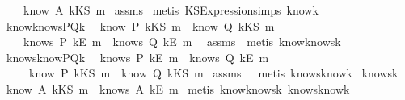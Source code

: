 \begin{isabellebody}
\ \ \ \ {\isachardoublequoteopen}know\ A\ {\isacharparenleft}kKS\ m{\isacharparenright}{\isachardoublequoteclose}\isanewline
\isadelimproof
\endisadelimproof
\isatagproof
{}\isamarkupfalse \ assms\isanewline
{}\isamarkupfalse \ {\isacharparenleft}metis\ KS{}Expression{\isachardot}simps{\isacharparenleft}{}{\isacharparenright}\ know{}k{\isacharparenright}\endisatagproof
{\isafoldproof}\isadelimproof
\isanewline
\endisadelimproof
\isanewline
{}\isamarkupfalse \ know{}knowsPQ{\isacharunderscore}k{\isacharcolon}\ \isanewline
{}\ {\isachardoublequoteopen}know\ P\ {\isacharparenleft}kKS\ m{\isacharparenright}\ {\isasymor}\ know\ Q\ {\isacharparenleft}kKS\ m{\isacharparenright}{\isachardoublequoteclose}\isanewline
{}\ \ \ \ {\isachardoublequoteopen}knows\ P\ {\isacharbrackleft}kE\ m{\isacharbrackright}\ {\isasymor}\ knows\ Q\ {\isacharbrackleft}kE\ m{\isacharbrackright}{\isachardoublequoteclose}\ \isanewline
\isadelimproof
\endisadelimproof
\isatagproof
{}\isamarkupfalse \ assms\ \isamarkupfalse \ {\isacharparenleft}metis\ know{}knows{\isacharunderscore}k{\isacharparenright}\endisatagproof
{\isafoldproof}\isadelimproof
\isanewline
\endisadelimproof
\isanewline
{}\isamarkupfalse \ knows{}knowPQ{\isacharunderscore}k{\isacharcolon}\ \isanewline
{}\ {\isachardoublequoteopen}knows\ P\ {\isacharbrackleft}kE\ m{\isacharbrackright}\ {\isasymor}\ knows\ Q\ {\isacharbrackleft}kE\ m{\isacharbrackright}{\isachardoublequoteclose}\isanewline
{}\ \ \ \ \ {\isachardoublequoteopen}know\ P\ {\isacharparenleft}kKS\ m{\isacharparenright}\ {\isasymor}\ know\ Q\ {\isacharparenleft}kKS\ m{\isacharparenright}{\isachardoublequoteclose}\isanewline
\isadelimproof
\endisadelimproof
\isatagproof
{}\isamarkupfalse \ assms\ \ \isamarkupfalse \ {\isacharparenleft}metis\ knows{}know{\isacharunderscore}k{\isacharparenright}\endisatagproof
{\isafoldproof}\isadelimproof
\isanewline
\endisadelimproof
\isanewline
{}\isamarkupfalse \ knows{}k{\isacharcolon}\ \isanewline
\ {\isachardoublequoteopen}know\ A\ {\isacharparenleft}kKS\ m{\isacharparenright}\ {\isacharequal}\ knows\ A\ {\isacharbrackleft}kE\ m{\isacharbrackright}{\isachardoublequoteclose}\isanewline
\isadelimproof
\endisadelimproof
\isatagproof
{}\isamarkupfalse \ {\isacharparenleft}metis\ know{}knows{\isacharunderscore}k\ knows{}know{\isacharunderscore}k{\isacharparenright}\endisatagproof

\end{isabellebody}
